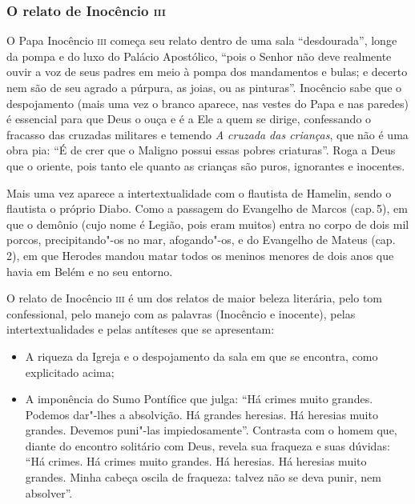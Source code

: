 \documentclass[12pt]{extarticle}
\begin{document}
\subsubsection{O relato de Inocêncio \textsc{iii}}


O Papa Inocêncio \textsc{iii} começa seu relato dentro de uma sala
``desdourada'', longe da pompa e do luxo do Palácio Apostólico, ``pois o
Senhor não deve realmente ouvir a voz de seus padres em meio à pompa dos
mandamentos e bulas; e decerto nem são de seu agrado a púrpura, as
joias, ou as pinturas''. Inocêncio sabe que o despojamento (mais
uma vez o branco aparece, nas vestes do Papa e nas paredes) é essencial
para que Deus o ouça e é a Ele a quem se dirige, confessando o fracasso
das cruzadas militares e temendo \textit{A cruzada das crianças}, que não é uma
obra pia: ``É de crer que o Maligno possui essas pobres criaturas''. Roga a Deus que o oriente, pois tanto ele quanto as crianças são
puros, ignorantes e inocentes.

Mais uma vez aparece a intertextualidade com o flautista de Hamelin,
sendo o flautista o próprio Diabo. Como a passagem do Evangelho de
Marcos (cap.\,5), em que o demônio (cujo nome é Legião, pois eram muitos)
entra no corpo de dois mil porcos, precipitando"-os no mar, afogando"-os, e
do Evangelho de Mateus (cap.\,2), em que Herodes mandou matar todos os
meninos menores de dois anos que havia em Belém e no seu entorno.

O relato de Inocêncio \textsc{iii} é um dos relatos de maior beleza literária,
pelo tom confessional, pelo manejo com as palavras (Inocêncio e
inocente), pelas intertextualidades e pelas antíteses que se
apresentam:

\begin{itemize}
\item A riqueza da Igreja e o despojamento da sala em que se encontra, como
explicitado acima;

\item A imponência do Sumo Pontífice que julga: ``Há crimes muito grandes.
Podemos dar"-lhes a absolvição. Há grandes heresias. Há heresias muito
grandes. Devemos puni"-las impiedosamente''. Contrasta com o
homem que, diante do encontro solitário com Deus, revela sua fraqueza e
suas dúvidas: ``Há crimes. Há crimes muito grandes. Há heresias. Há
heresias muito grandes. Minha cabeça oscila de fraqueza: talvez não se
deva punir, nem absolver''.
\end{itemize}
\end{document}
